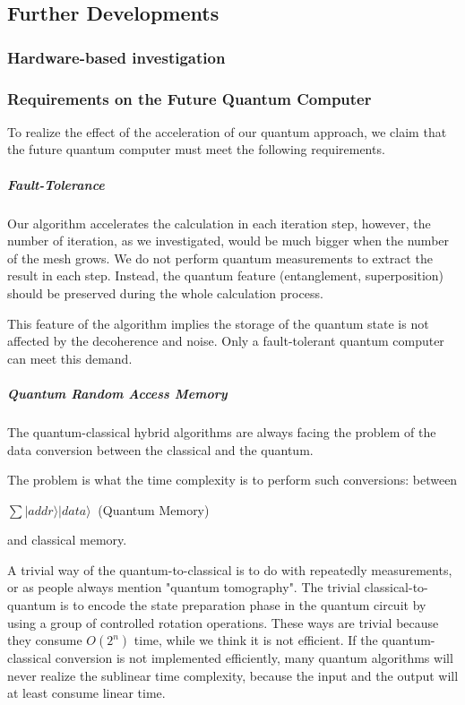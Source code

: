 \documentclass[%
 reprint,
 amsmath,amssymb,
pra,
]{revtex4-1}
\begin{document}
\subsection{Further Developments}

\subsubsection{Hardware-based investigation}

\subsubsection{Requirements on the Future Quantum Computer}

To realize the effect of the acceleration of our quantum approach, we claim that the future quantum computer must meet the following requirements.

\subparagraph{Fault-Tolerance}
Our algorithm accelerates the calculation in each iteration step, however, the number of iteration, as we investigated, would be much bigger when the number of the mesh grows. We do not perform quantum measurements to extract the result in each step. Instead, the quantum feature (entanglement, superposition) should be preserved during the whole calculation process. 

This feature of the algorithm implies the storage of the quantum state is not affected by the decoherence and noise. Only a fault-tolerant quantum computer can meet this demand.

\subparagraph{Quantum Random Access Memory}
The quantum-classical hybrid algorithms are always facing the problem of the data conversion between the classical and the quantum.

The problem is what the time complexity is to perform such conversions: between
\begin{center}
$ \sum|addr\rangle|data\rangle\ $ (Quantum Memory) 
\end{center}
and classical memory.

A trivial way of the quantum-to-classical is to do with repeatedly measurements, or as people always mention "quantum tomography". The trivial classical-to-quantum is to encode the state preparation phase in the quantum circuit by using a group of controlled rotation operations. These ways are trivial because they consume $O(2^n)$ time, while we think it is not efficient. If the quantum-classical conversion is not implemented efficiently, many quantum algorithms will never realize the sublinear time complexity, because the input and the output will at least consume linear time.
\end{document}
